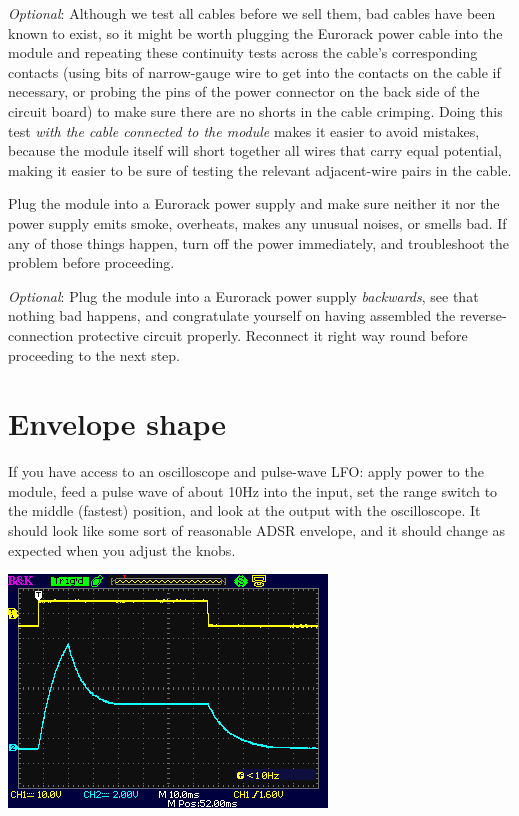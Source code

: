 \emph{Optional}:  Although we test all cables before we sell them, bad
cables have been known to exist, so it might be worth plugging the Eurorack
power cable into the module and repeating these continuity tests across the
cable's corresponding contacts (using bits of narrow-gauge wire to get into
the contacts on the cable if necessary, or probing the pins of the power
connector on the back side of the circuit board) to make sure there are no
shorts in the cable crimping.  Doing this test \emph{with the cable
connected to the module} makes it easier to avoid mistakes, because the
module itself will short together all wires that carry equal potential,
making it easier to be sure of testing the relevant adjacent-wire pairs in
the cable.

Plug the module into a Eurorack power supply and make sure
neither it nor the power supply emits smoke, overheats, makes any unusual
noises, or smells bad.  If any of those things happen, turn off the power
immediately, and troubleshoot the problem before proceeding.

\emph{Optional}: Plug the module into a Eurorack power supply
\emph{backwards}, see that nothing bad happens, and congratulate yourself on
having assembled the reverse-connection protective circuit properly. 
Reconnect it right way round before proceeding to the next step.

\section{Envelope shape}

If you have access to an oscilloscope and pulse-wave LFO:  apply power to
the module, feed a pulse wave of about 10Hz into the input, set the range
switch to the middle (fastest) position, and look at the output with the
oscilloscope.  It should look like some sort of reasonable ADSR envelope,
and it should change as expected when you adjust the knobs.

\noindent\includegraphics[width=\linewidth]{BK000032.png}

